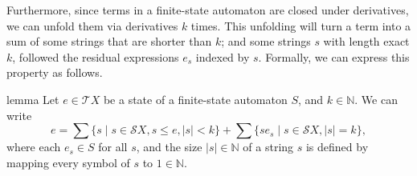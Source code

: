 \documentclass[11pt,a4paper]{amsart}
\theoremstyle{definition}
\begin{document}
Furthermore, since terms in a finite-state automaton are closed under
derivatives, we can unfold them via derivatives \(k\) times.  This unfolding
will turn a term into a sum of some strings that are shorter than \(k\); and
some strings \(s\) with length exact \(k\), followed the residual expressions
\(e_{s}\) indexed by \(s\).  Formally, we can express this property as follows.

\begin{theoremEnd}{lemma}
  \label{lem:expansion}
  Let $e  \in  \mathcal{T}X$ be a state of a finite-state automaton $S$, and
  $k  \in  \mathbb{N}$.  We can write
  \[ e =  \sum \{s \mid s  \in  \mathcal{S}X, s  \leq  e, |s| < k\} + %
     \sum \{se_s \mid s  \in  \mathcal{S}X, |s| = k\}, \] where each $e_s  \in  S$ for
  all $s$, and the size $|s|  \in  \mathbb{N}$ of a string $s$ is defined by mapping every
  symbol of $s$ to $1  \in  \mathbb{N}$.
\end{theoremEnd}
\end{document}
